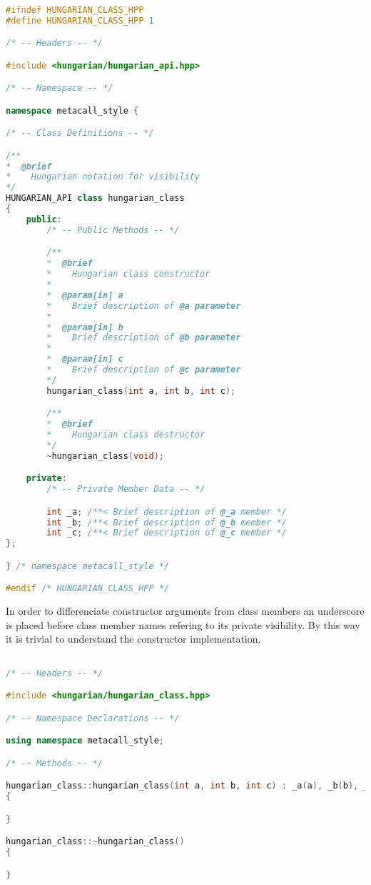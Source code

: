 \documentclass{article}
\begin{document}
% 

\begin{lstlisting}[language=C++]

#ifndef HUNGARIAN_CLASS_HPP
#define HUNGARIAN_CLASS_HPP 1

/* -- Headers -- */

#include <hungarian/hungarian_api.hpp>

/* -- Namespace -- */

namespace metacall_style {

/* -- Class Definitions -- */

/**
*  @brief
*    Hungarian notation for visibility
*/
HUNGARIAN_API class hungarian_class
{
	public:
		/* -- Public Methods -- */

		/**
		*  @brief
		*    Hungarian class constructor
		*
		*  @param[in] a
		*    Brief description of @a parameter
		*
		*  @param[in] b
		*    Brief description of @b parameter
		*
		*  @param[in] c
		*    Brief description of @c parameter
		*/
		hungarian_class(int a, int b, int c);

		/**
		*  @brief
		*    Hungarian class destructor
		*/
		~hungarian_class(void);

	private:
		/* -- Private Member Data -- */

		int _a;	/**< Brief description of @_a member */
		int _b;	/**< Brief description of @_b member */
		int _c;	/**< Brief description of @_c member */
};

} /* namespace metacall_style */

#endif /* HUNGARIAN_CLASS_HPP */

\end{lstlisting}

In order to differenciate constructor arguments from class members an underscore is placed before class
member names refering to its private visibility. By this way it is trivial to understand the constructor
implementation.


% 

\begin{lstlisting}[language=C++]

/* -- Headers -- */

#include <hungarian/hungarian_class.hpp>

/* -- Namespace Declarations -- */

using namespace metacall_style;

/* -- Methods -- */

hungarian_class::hungarian_class(int a, int b, int c) : _a(a), _b(b), _c(c)
{

}

hungarian_class::~hungarian_class()
{

}

\end{lstlisting}
\end{document}
